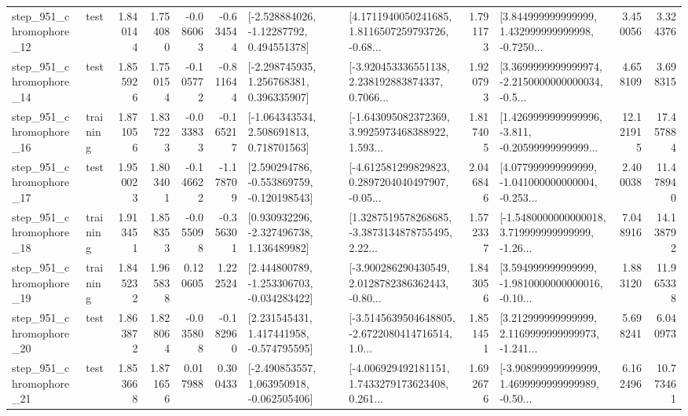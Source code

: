 \begin{tabular}{llrrrrllrlrr}
  step\_951\_chromophore\_12 &      test &      1.840144 &    1.754080 &     -0.086063 & -0.634544 &    [-2.528884026, -1.12287792, 0.494551378] &  [4.1711940050241685, 1.8116507259793726, -0.68... &       1.791173 &  [3.844999999999999, 1.432999999999998, -0.7250... &            3.450056 &          3.324376 \\
  step\_951\_chromophore\_14 &      test &      1.855926 &    1.750154 &     -0.105772 & -0.811644 &    [-2.298745935, 1.256768381, 0.396335907] &  [-3.920453336551138, 2.238192883874337, 0.7066... &       1.920793 &  [3.3699999999999974, -2.2150000000000034, -0.5... &            4.658109 &          3.698315 \\
  step\_951\_chromophore\_16 &  training &      1.871056 &    1.837223 &     -0.033833 & -0.165217 &    [-1.064343534, 2.508691813, 0.718701563] &  [-1.643095082372369, 3.9925973468388922, 1.593... &       1.817405 &  [1.4269999999999996, -3.811, -0.20599999999999... &           12.121915 &         17.457884 \\
  step\_951\_chromophore\_17 &      test &      1.950023 &    1.803401 &     -0.146622 & -1.178709 &   [2.590294786, -0.553869759, -0.120198543] &  [-4.612581299829823, 0.2897204040497907, -0.05... &       2.046846 &  [4.077999999999999, -1.041000000000004, -0.253... &            2.400038 &         11.478940 \\
  step\_951\_chromophore\_18 &  training &      1.913451 &    1.858353 &     -0.055098 & -0.356301 &    [0.930932296, -2.327496738, 1.136489982] &  [1.3287519578268685, -3.3873134878755495, 2.22... &       1.572337 &  [-1.5480000000000018, 3.719999999999999, -1.26... &            7.048916 &         14.138792 \\
  step\_951\_chromophore\_19 &  training &      1.845232 &    1.965838 &      0.120605 &  1.222524 &   [2.444800789, -1.253306703, -0.034283422] &  [-3.900286290430549, 2.0128782386362443, -0.80... &       1.843056 &  [3.594999999999999, -1.9810000000000016, -0.10... &            1.883120 &         11.965338 \\
  step\_951\_chromophore\_20 &      test &      1.863872 &    1.828064 &     -0.035808 & -0.182960 &    [2.231545431, 1.417441958, -0.574795595] &  [-3.5145639504648805, -2.6722080414716514, 1.0... &       1.851451 &  [3.212999999999999, 2.1169999999999973, -1.241... &            5.698241 &          6.040973 \\
  step\_951\_chromophore\_21 &      test &      1.853668 &    1.871656 &      0.017988 &  0.300433 &   [-2.490853557, 1.063950918, -0.062505406] &  [-4.006929492181151, 1.7433279173623408, 0.261... &       1.692676 &  [-3.908999999999999, 1.4699999999999989, -0.50... &            6.162496 &         10.773461 \\

\end{tabular}
